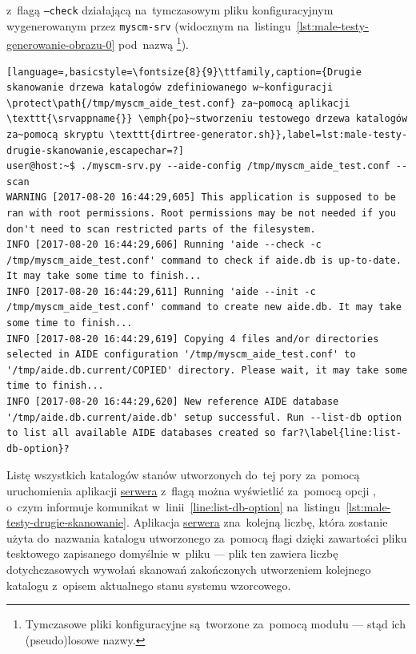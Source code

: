 \documentclass[thesis]{subfiles}
\begin{document}
z~flagą \texttt{--check} działającą na~tymczasowym pliku konfiguracyjnym wygenerowanym przez \texttt{myscm-srv} (widocznym na~listingu~\ref{lst:male-testy-generowanie-obrazu-0} pod~nazwą \footnote{Tymczasowe pliki konfiguracyjne są~tworzone za~pomocą modułu \python{}  --- stąd ich (pseudo)losowe nazwy.}).

\begin{lstlisting}[language=,basicstyle=\fontsize{8}{9}\ttfamily,caption={Drugie skanowanie drzewa katalogów zdefiniowanego w~konfiguracji \protect\path{/tmp/myscm_aide_test.conf} za~pomocą aplikacji \texttt{\srvappname{}} \emph{po}~stworzeniu testowego drzewa katalogów za~pomocą skryptu \texttt{dirtree-generator.sh}},label=lst:male-testy-drugie-skanowanie,escapechar=?]
user@host:~$ ./myscm-srv.py --aide-config /tmp/myscm_aide_test.conf --scan
WARNING [2017-08-20 16:44:29,605] This application is supposed to be ran with root permissions. Root permissions may be not needed if you don't need to scan restricted parts of the filesystem.
INFO [2017-08-20 16:44:29,606] Running 'aide --check -c /tmp/myscm_aide_test.conf' command to check if aide.db is up-to-date. It may take some time to finish...
INFO [2017-08-20 16:44:29,611] Running 'aide --init -c /tmp/myscm_aide_test.conf' command to create new aide.db. It may take some time to finish...
INFO [2017-08-20 16:44:29,619] Copying 4 files and/or directories selected in AIDE configuration '/tmp/myscm_aide_test.conf' to '/tmp/aide.db.current/COPIED' directory. Please wait, it may take some time to finish...
INFO [2017-08-20 16:44:29,620] New reference AIDE database '/tmp/aide.db.current/aide.db' setup successful. Run --list-db option to list all available AIDE databases created so far?\label{line:list-db-option}?
\end{lstlisting}

Listę wszystkich katalogów stanów utworzonych do~tej pory za~pomocą uruchomienia aplikacji \hyperref[sec:srv-app]{serwera} z~flagą  można wyświetlić za~pomocą opcji , o~czym informuje komunikat w~linii~\ref{line:list-db-option} na~listingu~\ref{lst:male-testy-drugie-skanowanie}. Aplikacja \hyperref[sec:srv-app]{serwera} zna~kolejną liczbę, która zostanie użyta do~nazwania katalogu utworzonego za~pomocą flagi  dzięki zawartości pliku tesktowego zapisanego domyślnie w~pliku  --- plik ten zawiera liczbę dotychczasowych wywołań skanowań zakończonych utworzeniem kolejnego katalogu z~opisem aktualnego stanu systemu wzorcowego.
\end{document}
